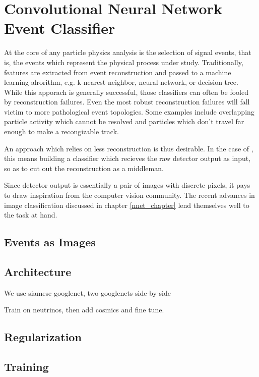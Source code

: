 \chapter{Convolutional Neural Network Event Classifier}
\label{cnn_chapter}

At the core of any particle physics analysis is the selection of signal events,
that is, the events which represent the physical process under study.
Traditionally, features are extracted from event reconstruction and passed
to a machine learning alrorithm, e.g. k-nearest neighbor, neural network, or
decision tree.
While this apporach is generally successful, those classifiers can often
be fooled by reconstruction failures.
Even the most robust reconstruction failures will fall victim to
more pathological event topologies.
Some examples include overlapping particle activity which cannot be resolved
and particles which don't travel far enough to make a recongizable track.

An approach which relies on less reconstruction is thus desirable.
In the case of \nova, this means building a classifier which recieves
the raw detector output as input, so as to cut out the reconstruction as a
middleman.

Since \nova detector output is essentially a pair of images with discrete
pixels, it pays to draw inspiration from the computer vision community.
The recent advances in image classification
\cite{krizhevsky2012imagenet,lecun2015deep,szegedy2014going}
discussed in chapter \ref{nnet_chapter} lend themselves well to the task at
hand.

\section{\nova Events as Images}



\section{Architecture}

We use siamese googlenet, two googlenets side-by-side

Train on neutrinos, then add cosmics and fine tune.


\section{Regularization}


\section{Training}




